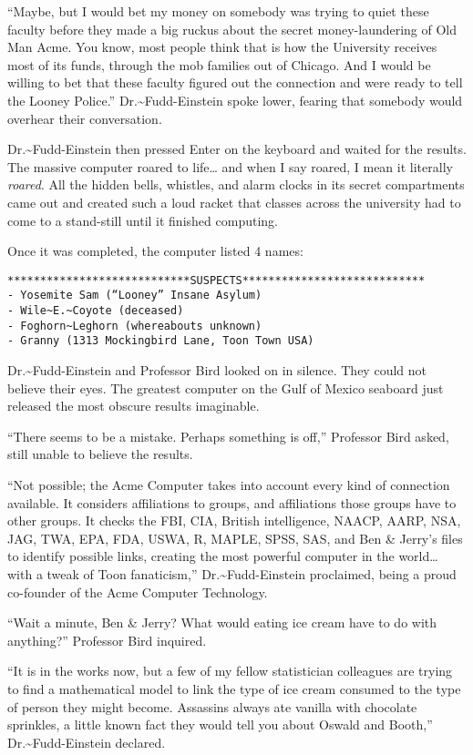 \documentclass[captions=tableheading]{scrbook}
\begin{document}
“Maybe, but I would bet my money on somebody was trying to quiet these faculty before they made a big ruckus about the secret money-laundering of Old Man Acme. You know, most people think that is how the University receives most of its funds, through the mob families out of Chicago. And I would be willing to bet that these faculty figured out the connection and were ready to tell the Looney Police.” Dr.\~{}Fudd-Einstein spoke lower, fearing that somebody would overhear their conversation.  

Dr.\~{}Fudd-Einstein then pressed \textsf{Enter} on the keyboard and waited for the results. The massive computer roared to life\ldots{} and when I say roared, I mean it literally \emph{roared}. All the hidden bells, whistles, and alarm clocks in its secret compartments came out and created such a loud racket that classes across the university had to come to a stand-still until it finished computing. 

Once it was completed, the computer listed 4 names:


\begin{verbatim}
****************************SUSPECTS****************************
- Yosemite Sam (“Looney” Insane Asylum) 
- Wile~E.~Coyote (deceased) 
- Foghorn~Leghorn (whereabouts unknown) 
- Granny (1313 Mockingbird Lane, Toon Town USA)
\end{verbatim}

Dr.\~{}Fudd-Einstein and Professor Bird looked on in silence. They could not believe their eyes. The greatest computer on the Gulf of Mexico seaboard just released the most obscure results imaginable.

“There seems to be a mistake. Perhaps something is off,” Professor Bird asked, still unable to believe the results.

“Not possible; the Acme Computer takes into account every kind of connection available. It considers affiliations to groups, and affiliations those groups have to other groups. It checks the FBI, CIA, British intelligence, NAACP, AARP, NSA, JAG, TWA, EPA, FDA, USWA, \textsf{R}, MAPLE, SPSS, SAS, and Ben \& Jerry’s files to identify possible links, creating the most powerful computer in the world\ldots{} with a tweak of Toon fanaticism,” Dr.\~{}Fudd-Einstein proclaimed, being a proud co-founder of the Acme Computer Technology.

“Wait a minute, Ben \& Jerry? What would eating ice cream have to do with anything?” Professor Bird inquired.

“It is in the works now, but a few of my fellow statistician colleagues are trying to find a mathematical model to link the type of ice cream consumed to the type of person they might become. Assassins always ate vanilla with chocolate sprinkles, a little known fact they would tell you about Oswald and Booth,” Dr.\~{}Fudd-Einstein declared.
\end{document}
